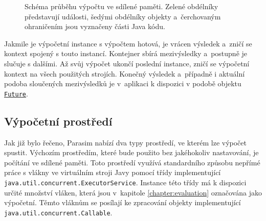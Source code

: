 \begin{figure}[H]
\begin{center}
{}
\end{center}
\caption{Schéma průběhu výpočtu ve sdílené paměti. Zelené obdélníky představují události,
šedými obdélníky objekty a~čer\-cho\-va\-ným ohraničením jsou vyznačeny části Java kódu.}
\end{figure}

Jakmile je výpočetní instance s výpočtem hotová, je vrácen výsledek a~zničí se
kontext spojený s touto instancí. Kontejner sbírá mezivýsledky a~postupně je slučuje
s dalšími. Až svůj výpočet ukončí poslední instance, zničí se výpočetní kontext na
všech použitých strojích. Konečný výsledek a~pří\-pad\-ně i aktuální podoba sloučených
mezivýsledků je v~aplikaci k dispozici v podobě objektu \href{https://github.com/sybila/parasim/blob/2.0.0.Final/extensions/computation-lifecycle-api/src/main/java/org/sybila/parasim/computation/lifecycle/api/Future.java}{\texttt{Future}}.

\subsection{Výpočetní prostředí}

Jak již bylo řečeno, Parasim nabízí dva typy prostředí, ve kterém lze výpočet spustit.
Výchozím prostředím, které bude použito bez jakéhokoliv na\-sta\-vo\-vá\-ní, je počítání ve sdílené paměti.
Toto prostředí využívá standardního způsobu nepřímé práce s vlákny ve virtuálním stroji Javy
pomocí třídy implementující \texttt{java.util.concurrent.ExecutorService}.
Instance té\-to třídy má k dispozici určité množství vláken, která jsou v~kapitole
\ref{chapter:evaluation} označována jako výpočetní. Těmto vláknům se posílají ke
zpracování objekty implementující \texttt{java.util.concurrent.Callable}.


